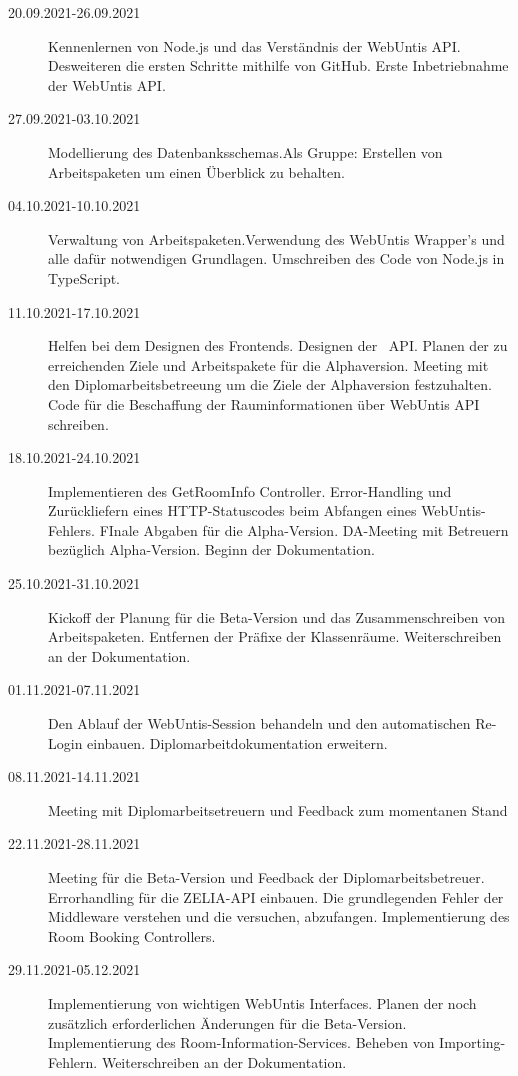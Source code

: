 
\begin{description}
    \item[20.09.2021-26.09.2021] Kennenlernen von Node.js und das Verständnis der WebUntis API. Desweiteren die ersten Schritte mithilfe von GitHub. Erste Inbetriebnahme der WebUntis API. 
    \item[27.09.2021-03.10.2021] Modellierung des Datenbanksschemas.Als Gruppe: Erstellen von Arbeitspaketen um einen Überblick zu behalten.
    \item[04.10.2021-10.10.2021] Verwaltung von Arbeitspaketen.Verwendung des WebUntis Wrapper's und alle dafür notwendigen Grundlagen. Umschreiben des Code von Node.js in TypeScript.
    \item[11.10.2021-17.10.2021] Helfen bei dem Designen des Frontends. Designen der \ZELIA\ API. Planen der zu erreichenden Ziele und Arbeitspakete für die Alphaversion. Meeting mit den Diplomarbeitsbetreeung um die Ziele der Alphaversion festzuhalten. Code für die Beschaffung der Rauminformationen über WebUntis API schreiben. 
    \item[18.10.2021-24.10.2021] Implementieren des GetRoomInfo Controller. Error-Handling und Zurückliefern eines HTTP-Statuscodes beim Abfangen eines WebUntis-Fehlers. FInale Abgaben für die Alpha-Version. DA-Meeting mit Betreuern bezüglich Alpha-Version. Beginn der Dokumentation.
    \item[25.10.2021-31.10.2021] Kickoff der Planung für die Beta-Version und das Zusammenschreiben von Arbeitspaketen. Entfernen der Präfixe der Klassenräume. Weiterschreiben an der Dokumentation.
    \item[01.11.2021-07.11.2021] Den Ablauf der WebUntis-Session behandeln und den automatischen Re-Login einbauen. Diplomarbeitdokumentation erweitern. 
    \item[08.11.2021-14.11.2021] Meeting mit Diplomarbeitsetreuern und Feedback zum momentanen Stand
    \item[22.11.2021-28.11.2021] Meeting für die Beta-Version und Feedback der Diplomarbeitsbetreuer. Errorhandling für die ZELIA-API einbauen. Die grundlegenden Fehler der Middleware verstehen und die versuchen, abzufangen. Implementierung des Room Booking Controllers. 
    \item[29.11.2021-05.12.2021] Implementierung von wichtigen WebUntis Interfaces. Planen der noch zusätzlich erforderlichen Änderungen für die Beta-Version. Implementierung des Room-Information-Services. Beheben von Importing-Fehlern. Weiterschreiben an der Dokumentation.

\end{description}
